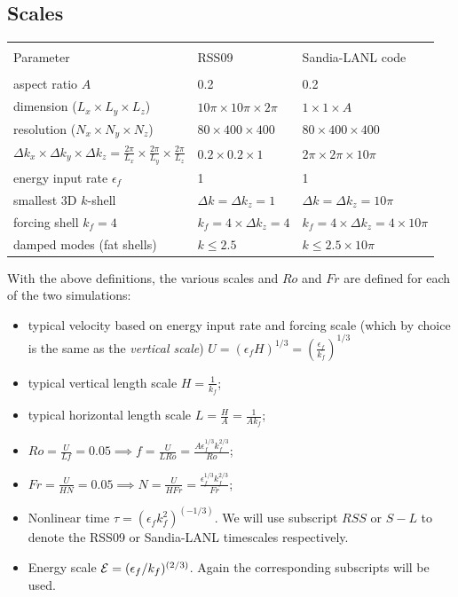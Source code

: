 \documentclass[12pt]{article}
\begin{document}
\subsection{Scales}
\begin{table}[ht]
\begin{tabular}{lll}
\hline\\
Parameter & RSS09 & Sandia-LANL code\\
\hline\\
aspect ratio $A$ & 0.2 & 0.2\\
dimension ($L_x \times L_y\times L_z$) & $10\pi \times 10\pi \times 2\pi $ & $1  \times 1 \times A$ \\  
resolution ($N_x \times N_y \times N_z$) & $80 \times 400 \times 400$ & $80 \times 400 \times 400$ \\
$\Delta k_x \times \Delta k_y \times \Delta k_z = \frac{2\pi}{L_x} \times \frac{2\pi}{L_y} \times \frac{2\pi}{L_z}$ & 
$0.2 \times 0.2 \times 1$ & $2\pi \times 2\pi \times 10\pi$  \\
energy input rate $\epsilon_f$ & 1 & 1 \\
smallest 3D $k$-shell &  $\Delta k = \Delta k_z = 1$ & $\Delta k = \Delta k_z = 10\pi$\\  
forcing shell $k_f = 4$ & $k_f = 4\times \Delta k_z = 4$ & $k_f = 4 \times \Delta k_z = 4\times 10\pi$\\
damped modes (fat shells) & $k \leq 2.5$ & $k \leq 2.5\times 10\pi $ \\
\hline
\end{tabular}
\end{table}

With the above definitions, the various scales and $Ro$ and $Fr$ are
defined for each of the two simulations:
\begin{itemize}
\item typical velocity based on energy input rate and forcing scale
  (which by choice is the same as the {\it vertical scale}) $U =
  ({\epsilon_f}{H})^{1/3} = \displaystyle(\frac{\epsilon_f}{k_f})^{1/3}$
\item typical vertical length scale $H = \displaystyle\frac{1}{k_f}$; 
\item typical horizontal length scale $L = \displaystyle\frac{H}{A} = \displaystyle\frac{1}{A k_f}$;
\item $Ro = \displaystyle\frac{U}{Lf} = 0.05 \implies f = \displaystyle\frac{U}{L Ro} = \displaystyle\frac{A \epsilon_f^{1/3}  k_f^{2/3} } {Ro}$;
\item $Fr = \displaystyle\frac{U}{HN} = 0.05 \implies N = \displaystyle\frac{U}{H Fr} = \displaystyle\frac{\epsilon_f^{1/3}k_f^{2/3}}{Fr}$;
\item Nonlinear time $\tau = (\epsilon_f k_f^2)^{(-1/3)}$. We will use subscript $RSS$ or $S-L$ to denote the RSS09 or Sandia-LANL timescales respectively.
\item Energy scale ${\cal E} = (\epsilon_f /k_f)^{(2/3)}$. Again the corresponding subscripts will be used.
\end{itemize}
\end{document}

